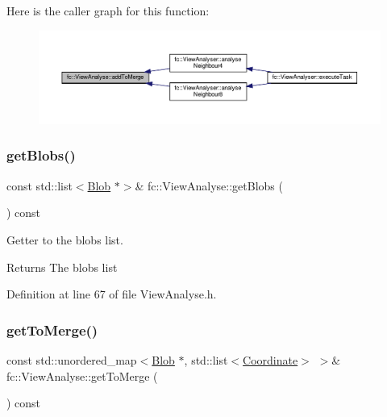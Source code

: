 Here is the caller graph for this function\+:
\nopagebreak
\begin{figure}[H]
\begin{center}
\leavevmode
\includegraphics[width=350pt]{d8/d72/classfc_1_1ViewAnalyse_ab1138c97855a370559dd6df6521529c7_icgraph}
\end{center}
\end{figure}
\mbox{\label{classfc_1_1ViewAnalyse_a8c17dd40de33f16768c9733e978b7f12}} 
\subsubsection{\texorpdfstring{get\+Blobs()}{getBlobs()}}
{\footnotesize\ttfamily const std\+::list$<$\hyperlink{classfc_1_1Blob}{Blob} $\ast$$>$\& fc\+::\+View\+Analyse\+::get\+Blobs (\begin{DoxyParamCaption}{ }\end{DoxyParamCaption}) const\hspace{0.3cm}{\ttfamily [inline]}}



Getter to the blobs list. 

\begin{DoxyReturn}{Returns}
The blobs list 
\end{DoxyReturn}


Definition at line 67 of file View\+Analyse.\+h.

\mbox{\label{classfc_1_1ViewAnalyse_a67f51d5e398dd7ebd193c60d7702cb6d}} 
\subsubsection{\texorpdfstring{get\+To\+Merge()}{getToMerge()}}
{\footnotesize\ttfamily const std\+::unordered\+\_\+map$<$\hyperlink{classfc_1_1Blob}{Blob} $\ast$, std\+::list$<$\hyperlink{namespacefc_a7da125cb1e99553c27c07139ee8a62ca}{Coordinate}$>$ $>$\& fc\+::\+View\+Analyse\+::get\+To\+Merge (\begin{DoxyParamCaption}{ }\end{DoxyParamCaption}) const\hspace{0.3cm}{\ttfamily [inline]}}




